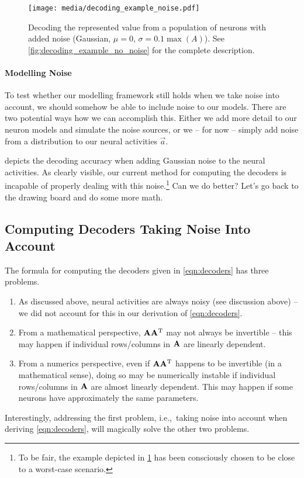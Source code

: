 \documentclass[10pt,letterpaper,oneside]{article}
\begin{document}
\begin{figure}
	\centering
	\texttt{[image: media/decoding\_example\_noise.pdf]}
	\caption{Decoding the represented value from a population of neurons with added noise (Gaussian, $\mu = 0$, $\sigma = 0.1 \max(A)$). See \cref{fig:decoding_example_no_noise} for the complete description. }
	\label{fig:decoding_example_noise}
\end{figure}


\paragraph{Modelling Noise}
To test whether our modelling framework still holds when we take noise into account, we should somehow be able to include noise to our models. There are two potential ways how we can accomplish this. Either we add more detail to our neuron models and simulate the noise sources, or we -- for now -- simply add noise from a distribution to our neural activities $\vec a$.

 depicts the decoding accuracy when adding Gaussian noise to the neural activities. As clearly visible, our current method for computing the decoders is incapable of properly dealing with this noise.\footnote{To be fair, the example depicted in \cref{fig:decoding_example_noise} has been consciously chosen to be close to a worst-case scenario.} Can we do better? Let's go back to the drawing board and do some more math.

\subsection{Computing Decoders Taking Noise Into Account}

The formula for computing the decoders given in \cref{eqn:decoders} has three problems.
\begin{enumerate}[1.]
	\item As discussed above, neural activities are always noisy (see discussion above) -- we did not account for this in our derivation of \cref{eqn:decoders}.
	\item From a mathematical perspective, ${\mathbf{A}} {\mathbf{A}}^{\mathrm{T}}$ may not always be invertible -- this may happen if individual rows/columns in ${\mathbf{A}}$ are linearly dependent.
	\item From a numerics perspective, even if ${\mathbf{A}} {\mathbf{A}}^{\mathrm{T}}$ happens to be invertible (in a mathematical sense), doing so may be numerically instable if individual rows/columns in ${\mathbf{A}}$ are almost linearly dependent. This may happen if some neurons have approximately the same parameters.
\end{enumerate}
Interestingly, addressing the first problem, i.e.,~taking noise into account when deriving \cref{eqn:decoders}, will magically solve the other two problems.
\end{document}
